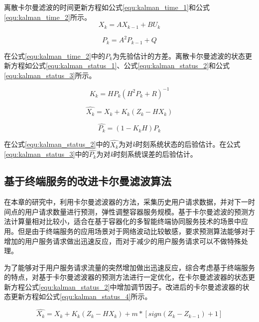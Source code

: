 离散卡尔曼滤波的时间更新方程如公式\ref{equ:kalman_time_1}和公式\ref{equ:kalman_time_2}所示。
\begin{equation}\label{equ:kalman_time_1}
    X_k=AX_{k-1}+BU_k
\end{equation}

\begin{equation}\label{equ:kalman_time_2}
    P_k=A^2P_{k-1}+Q
\end{equation}

在公式\ref{equ:kalman_time_2}中的$P_k$为先验估计的方差。离散卡尔曼滤波的状态更新方程如公式\ref{equ:kalman_status_1}、公式\ref{equ:kalman_status_2}和公式\ref{equ:kalman_status_3}所示。

\begin{equation}\label{equ:kalman_status_1}
    K_k=HP_k(H^2P_k+R)^{-1}
\end{equation}

\begin{equation}\label{equ:kalman_status_2}
    \widehat{X_k}=X_k+K_{k}(Z_k-HX_k)
\end{equation}

\begin{equation}\label{equ:kalman_status_3}
    \widehat{P_k}=(1-K_kH)P_k
\end{equation}

在公式\ref{equ:kalman_status_2}中的$\widehat{X_k}$为对\emph{k}时刻系统状态的后验估计。在公式\ref{equ:kalman_status_3}中的$\widehat{P_k}$为对\emph{k}时刻系统误差的后验估计。

\subsection{基于终端服务的改进卡尔曼滤波算法}

在本章的研究中，利用卡尔曼滤波器的方法，采集历史用户请求数据，并对下一时间点的用户请求数量进行预测，弹性调整容器服务规模。基于卡尔曼滤波的预测方法计算量相对比较小，适合在基于容器化的多智能终端协同服务技术的场景中应用。但是由于终端服务的应用场景对于网络波动比较敏感，要求预测算法能够对于增加的用户服务请求做出迅速反应，而对于减少的用户服务请求可以不做特殊处理。

为了能够对于用户服务请求流量的突然增加做出迅速反应，综合考虑基于终端服务的特点，对基于卡尔曼滤波器的预测方法进行一定优化，在卡尔曼滤波器的状态更新方程公式\ref{equ:kalman_status_2}中增加调节因子。改进后的卡尔曼滤波器的状态更新方程如公式\ref{equ:kalman_status_4}所示。

\begin{equation}\label{equ:kalman_status_4}
    \widehat{X_k}=X_k+K_{k}(Z_k-HX_k)+m*[sign(Z_k-Z_{k-1})+1]
\end{equation}

